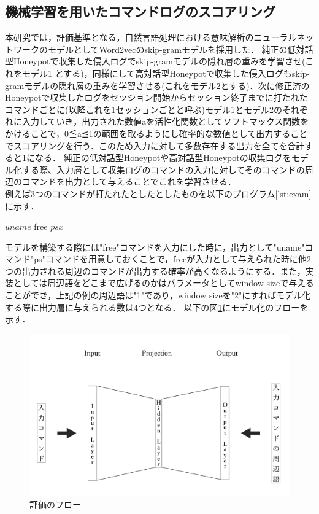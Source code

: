 \subsection{機械学習を用いたコマンドログのスコアリング}
\label{eval:impl}
本研究では，評価基準となる，自然言語処理における意味解析のニューラルネットワークのモデルとしてWord2vecのskip-gramモデルを採用した．
純正の低対話型Honeypotで収集した侵入ログでskip-gramモデルの隠れ層の重みを学習させ(これをモデル1
とする)，同様にして高対話型Honeypotで収集した侵入ログもskip-gramモデルの隠れ層の重みを学習させる(これをモデル2とする)．次に修正済のHoneypotで収集したログをセッション開始からセッション終了までに打たれたコマンドごとに(以降これを1セッションごとと呼ぶ)モデル1とモデル2のそれぞれに入力していき，出力された数値aを活性化関数としてソフトマックス関数をかけることで，0≦a≦1の範囲を取るようにし確率的な数値として出力することでスコアリングを行う．このため入力に対して多数存在する出力を全てを合計すると1になる．
純正の低対話型Honeypotや高対話型Honeypotの収集ログをモデル化する際、入力層として収集ログのコマンドの入力に対してそのコマンドの周辺のコマンドを出力として与えることでこれを学習させる．\\
例えば3つのコマンドが打たれたとしたとしたものを以下のプログラム\ref{lst:exam}に示す．

\vspace{5mm}
\begin{mylisting}[label={lst:exam},language=sh,caption=3つの実行コマンドの例]
 $ uname
 $ free
 $ ps x
 $
\end{mylisting}
\vspace{5mm}

モデルを構築する際には"free"コマンドを入力にした時に，出力として"uname"コマンド"ps"コマンドを用意しておくことで，freeが入力として与えられた時に他2つの出力される周辺のコマンドが出力する確率が高くなるようにする．また，実装としては周辺語をどこまで広げるのかはパラメータとしてwindow sizeで与えることができ，上記の例の周辺語は"1"であり，window sizeを"2"にすればモデル化する際に出力層に与えられる数は4つとなる．
以下の図\ref{fig:hyoukaflow}にモデル化のフローを示す．
\clearpage

\vspace{10mm}
\begin{figure}[htbp]
    \centering
    \includegraphics[width=1.0\textwidth]{figures/model.png}
    \caption{評価のフロー\cite{word2vecpaper}\cite{word2vecpaper2}}
    \label{fig:hyoukaflow}
\end{figure}
\vspace{10mm}

